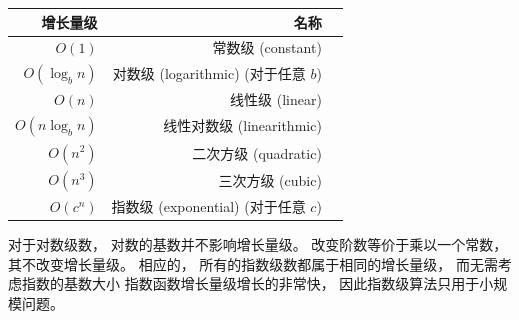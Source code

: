 \begin{center}
\begin{tabular}{|r|r|r|}
\hline
增长量级     &   名称      \\
\hline
$O(1)$             & 常数级 (constant) \\
$O(\log_b n)$      & 对数级 (logarithmic) (对于任意 $b$) \\
$O(n)$             & 线性级 (linear)\\
$O(n \log_b n)$    & 线性对数级 (linearithmic)\\
$O(n^2)$           & 二次方级 (quadratic)    \\
$O(n^3)$           & 三次方级 (cubic)    \\
$O(c^n)$           & 指数级 (exponential) (对于任意 $c$)    \\
\hline
\end{tabular}
\end{center}


对于对数级数， 对数的基数并不影响增长量级。
改变阶数等价于乘以一个常数， 其不改变增长量级。
相应的， 所有的指数级数都属于相同的增长量级， 而无需考虑指数的基数大小
指数函数增长量级增长的非常快， 因此指数级算法只用于小规模问题。
  


